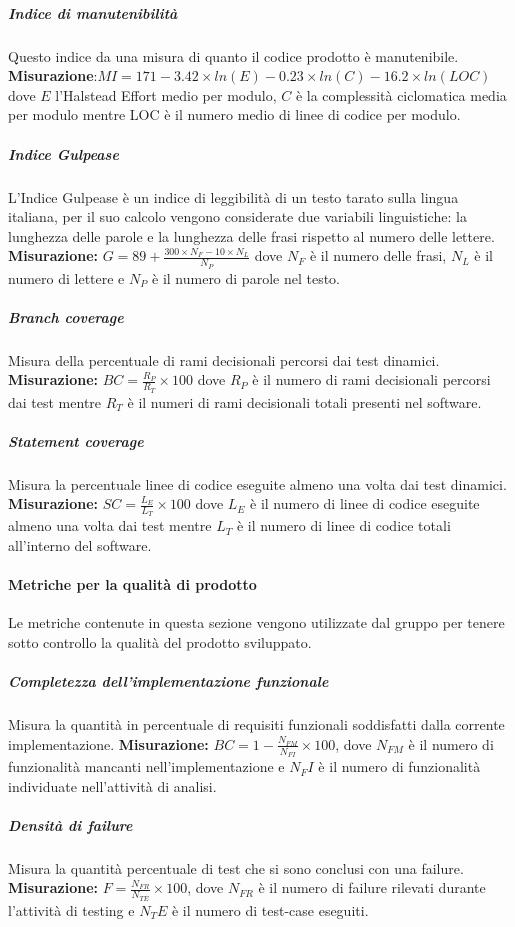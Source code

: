 \subparagraph{Indice di manutenibilità}  \Spazio
Questo indice da una misura di quanto il codice prodotto è manutenibile.
\textbf{Misurazione}:$MI=171-3.42\times ln(E)-0.23\times ln(C)-16.2\times ln(LOC)$ dove $E$  l'Halstead Effort medio per modulo, $C$ è la complessità ciclomatica media per modulo mentre LOC è il numero medio di linee di codice per modulo.

\subparagraph{Indice Gulpease} \Spazio
L'Indice Gulpease è un indice di leggibilità di un testo tarato sulla lingua italiana, per il suo calcolo vengono considerate due variabili linguistiche: la lunghezza delle parole e la lunghezza delle frasi rispetto al numero delle lettere.
\textbf{Misurazione:} $G=89+\frac{300\times N_F-10\times N_L}{N_P}$ dove $N_F$ è il numero delle frasi, $N_L$ è il numero di lettere e $N_P$ è il numero di parole nel testo.

\subparagraph{Branch coverage}  \Spazio
Misura della percentuale di rami decisionali percorsi dai test dinamici.
\textbf{Misurazione:} $BC=\frac{R_P}{R_T}\times 100$ dove $R_P$ è il numero di rami decisionali percorsi dai test mentre $R_T$ è il numeri di rami decisionali totali presenti nel software.

\subparagraph{Statement coverage} \Spazio
Misura la percentuale linee di codice eseguite almeno una volta dai test dinamici.
\textbf{Misurazione:} $SC=\frac{L_E}{L_T}\times 100$ dove $L_E$ è il numero di linee di codice eseguite almeno una volta dai test mentre $L_T$ è il numero di linee di codice totali all'interno del software.

\paragraph{Metriche per la qualità di prodotto}	\Spazio
Le metriche contenute in questa sezione vengono utilizzate dal gruppo per tenere sotto controllo la qualità del prodotto sviluppato.

\subparagraph{Completezza dell'implementazione funzionale}\Spazio
Misura la quantità in percentuale di requisiti funzionali soddisfatti dalla corrente implementazione.
\textbf{Misurazione:}  $BC=1-\frac{N_{FM}}{N_{FI}}\times 100$, dove $N_{FM}$  è il numero di funzionalità mancanti nell'implementazione e $N_FI$ è il numero di funzionalità individuate nell'attività di analisi.

\subparagraph{Densità di failure} \Spazio
Misura la quantità percentuale di test che si sono conclusi con una failure.
\textbf{Misurazione:} $F=\frac{N_{FR}}{N_{TE}}\times 100$, dove $N_{FR}$ è il numero di failure rilevati durante l'attività di testing e ${N_TE}$ è il numero di test-case eseguiti.

